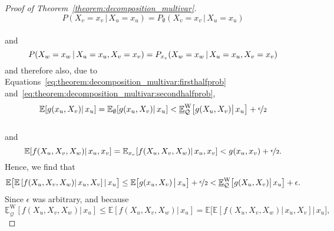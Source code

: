 \documentclass[10pt,a4paper]{paper}
\theoremstyle{definition}
\newcommand{\states}{\mathcal{X}}
\newcommand{\rateset}{\mathcal{Q}}
\begin{document}
\begin{proof}[Proof of Theorem~\ref{theorem:decomposition_multivar}]
\begin{equation*}
P(X_v=x_v\,\vert\,X_u=x_u) = P_\emptyset(X_v=x_v\,\vert\,X_u=x_u)
\end{equation*}\\[-20pt]
and
\begin{equation*}
P(X_w=x_w\,\vert\,X_u=x_u,X_v=x_v) = P_{x_v}(X_w=x_w\,\vert\,X_u=x_u,X_v=x_v)\vspace{6pt}
\end{equation*}
and therefore also, due to Equations~\eqref{eq:theorem:decomposition_multivar:firsthalfprob} and~\eqref{eq:theorem:decomposition_multivar:secondhalfprob},
\begin{equation*}%
\mathbb{E}[g(x_u,X_v)\vert\,x_u]
=\mathbb{E}_{\emptyset}[g(x_u,X_v)\vert\,x_u]
< \underline{\mathbb{E}}^{\mathrm{W}}_\rateset\bigl[g(X_u,X_v)\big\vert\,x_u\bigr]
+\nicefrac{\epsilon}{2}
\end{equation*}\\[-20pt]
and
\begin{equation*}%
\mathbb{E}[f(X_u,X_v,X_w)\vert\,x_u,x_v]
=\mathbb{E}_{x_v}[f(X_u,X_v,X_w)\vert\, x_u,x_v]
<g(x_u,x_v)+\nicefrac{\epsilon}{2}.\vspace{6pt}
\end{equation*}
Hence, we find that
\begin{align*}
\mathbb{E}\bigl[\mathbb{E}\left[f(X_u,X_v,X_w)\vert\,x_u,X_v\right]\vert\,x_u\bigr]
\leq
\mathbb{E}\bigl[g(x_u,X_v)\,\big\vert\,x_u\bigr]+\nicefrac{\epsilon}{2}
< \underline{\mathbb{E}}^{\mathrm{W}}_\rateset\bigl[g(X_u,X_v)\big\vert\,x_u\bigr]
+\epsilon.
\end{align*}
Since $\epsilon$ was arbitrary, and because
\begin{equation*}
\underline{\mathbb{E}}^{\mathrm{W}}_\rateset\left[f(X_u,X_v,X_w)\vert\,x_u\right]
\leq
\mathbb{E}\left[f(X_u,X_v,X_w)\vert\,x_u\right] = \mathbb{E}\bigl[\mathbb{E}\left[f(X_u,X_v,X_w)\vert\,x_u,X_v\right]\vert\,x_u\bigr],

\end{equation*}
\end{proof}
\end{document}
